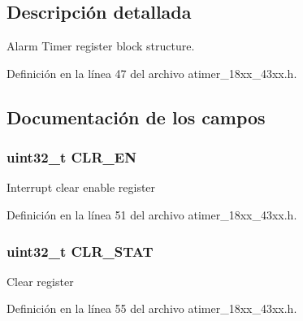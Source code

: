\subsection{Descripción detallada}
Alarm Timer register block structure. 

Definición en la línea 47 del archivo atimer\+\_\+18xx\+\_\+43xx.\+h.



\subsection{Documentación de los campos}
\subsubsection[{\texorpdfstring{C\+L\+R\+\_\+\+EN}{CLR_EN}}]{ uint32\+\_\+t C\+L\+R\+\_\+\+EN}\hypertarget{struct_l_p_c___a_t_i_m_e_r___t_a0d317a6488644b87e17e5f559c08289f}{}\label{struct_l_p_c___a_t_i_m_e_r___t_a0d317a6488644b87e17e5f559c08289f}
Interrupt clear enable register 

Definición en la línea 51 del archivo atimer\+\_\+18xx\+\_\+43xx.\+h.

\subsubsection[{\texorpdfstring{C\+L\+R\+\_\+\+S\+T\+AT}{CLR_STAT}}]{ uint32\+\_\+t C\+L\+R\+\_\+\+S\+T\+AT}\hypertarget{struct_l_p_c___a_t_i_m_e_r___t_a2736f94695ea3082afc55537cc4172b4}{}\label{struct_l_p_c___a_t_i_m_e_r___t_a2736f94695ea3082afc55537cc4172b4}
Clear register 

Definición en la línea 55 del archivo atimer\+\_\+18xx\+\_\+43xx.\+h.

